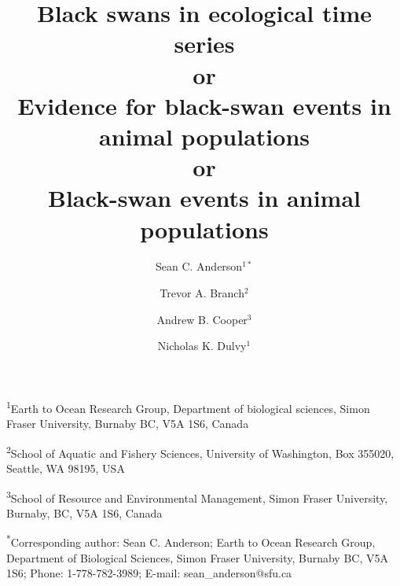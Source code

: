 \documentclass[12pt]{article}
\title{Black swans in ecological time series\\
or\\
Evidence for black-swan events in animal populations\\
or\\
Black-swan events in animal populations
}
\author{
Sean C. Anderson$^{1\ast}$ \and
Trevor A. Branch$^2$ \and
Andrew B. Cooper$^3$ \and
Nicholas K. Dulvy$^1$
}
\date{}
\begin{document}
\maketitle
\doublespacing


\noindent

\noindent
\textsuperscript{1}Earth to Ocean Research Group,
Department of biological sciences,
Simon Fraser University, Burnaby BC, V5A 1S6, Canada

\noindent
\textsuperscript{2}School of Aquatic and Fishery Sciences,
University of Washington, Box 355020, Seattle, WA 98195, USA

\noindent
\textsuperscript{3}School of Resource and Environmental Management,
Simon Fraser University, Burnaby, BC, V5A 1S6, Canada

\noindent
\textsuperscript{*}Corresponding author: Sean C. Anderson;
Earth to Ocean Research Group,
Department of Biological Sciences,
Simon Fraser University,
Burnaby BC, V5A 1S6;
Phone: 1-778-782-3989;
E-mail: sean\_anderson@sfu.ca

\thispagestyle{empty}

\linenumbers




\end{document}
